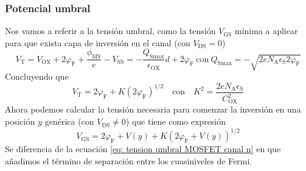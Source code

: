 \subsubsection{Potencial umbral}
Nos vamos a referir a la tensión umbral, como la tensión $V_\mathrm{GS}$ mínima a aplicar para que exista capa de inversión en el canal (con $V_\mathrm{DS}=0$)
\begin{equation*}
V_\mathrm{T}=V_\mathrm{OX}+2\varphi_\mathrm{F}+\frac{\phi_\mathrm{MS}}{e}-V_\mathrm{SS}=-\frac{Q_\mathrm{S max}}{\epsilon_\mathrm{OX}}d+2\varphi_\mathrm{F} \ \text{con} \ Q_\mathrm{S max}=-\sqrt{2eN_\mathrm{A}\epsilon_\mathrm{S}2\varphi_\mathrm{F}}
\end{equation*}
Concluyendo que 
\begin{equation}
V_\mathrm{T}=2\varphi_\mathrm{F}+K(2\varphi_\mathrm{F})^{1/2} \quad \text{con} \quad K^2=\frac{2eN_\mathrm{A}\epsilon_\mathrm{S}}{C^2_\mathrm{OX}}
\label{eq: tension umbral MOSFET canal n}
\end{equation}
Ahora podemos calcular la tensión necesaria para comenzar la inversión en una posición $y$ genérica (con $V_\mathrm{DS}\neq 0$) que tiene como expresión
\begin{equation}
V_\mathrm{GS}=2\varphi_\mathrm{F}+V(y)+K(2\varphi_\mathrm{F}+V(y))^{1/2}
\label{eq: Tension VGS generica para dar inversion}
\end{equation}
Se diferencia de la ecuación \ref{eq: tension umbral MOSFET canal n} en que añadimos el término de separación entre los cuasiniveles de Fermi.
